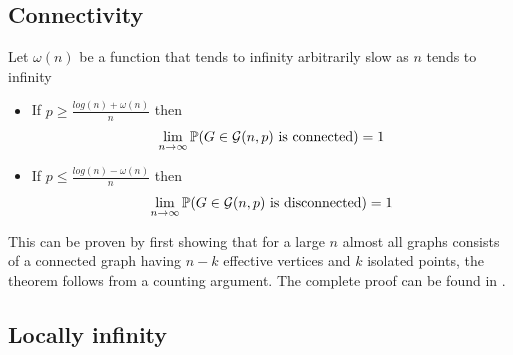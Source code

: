 \subsection{Connectivity}
\begin{theorem}
Let $\omega(n)$ be a function that tends to infinity arbitrarily slow as $n$ tends to infinity
\begin{itemize}
\item If $p\geq \frac{log(n)+ \omega(n)}{n}$ then 
$$\lim_{n \to \infty} \mathbb{P}(G \in \mathcal{G}(n,p) \text{ is connected}) = 1$$
\item If $p\leq \frac{log(n)- \omega(n)}{n}$ then
$$\lim_{n \to \infty} \mathbb{P}(G \in \mathcal{G}(n,p) \text{ is disconnected}) = 1$$
\end{itemize}
\end{theorem}
 
This can be proven by first showing that for a large $n$ almost all graphs consists of a connected graph having $n-k$ effective vertices and $k$ isolated points, the theorem follows from a counting argument. The complete proof can be found in \cite[Erdös-Rényi, 59]{OnRandomGraphs}.
 
\subsection{Locally infinity}

